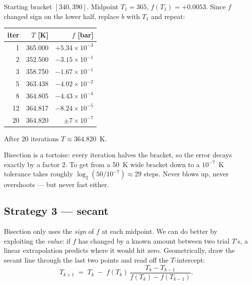 \documentclass[11pt,a4paper]{article}
\begin{document}
\begin{example}
Starting bracket $[340, 390]$.  Midpoint $T_1 = 365$, $f(T_1) = +0.0053$.
Since $f$ changed sign on the lower half, replace $b$ with $T_1$ and
repeat:
\begin{center}\small
\begin{tabular}{rrr}
\toprule
iter & $T$ [K] & $f$ [bar]\\
\midrule
 1 & 365.000 & $+5.34\times 10^{-3}$\\
 2 & 352.500 & $-3.15\times 10^{-1}$\\
 3 & 358.750 & $-1.67\times 10^{-1}$\\
 5 & 363.438 & $-4.02\times 10^{-2}$\\
 8 & 364.805 & $-4.43\times 10^{-4}$\\
12 & 364.817 & $-8.24\times 10^{-5}$\\
20 & 364.820 & $\pm 7\times 10^{-7}$\\
\bottomrule
\end{tabular}
\end{center}
After 20 iterations $T \approx 364.820$~K.
\end{example}

Bisection is a tortoise: every iteration halves the bracket, so the
error decays exactly by a factor 2.  To get from a 50~K wide bracket
down to a $10^{-7}$~K tolerance takes roughly $\log_2(50/10^{-7})
\approx 29$ steps.  Never blows up, never overshoots --- but never
fast either.

\subsection{Strategy 3 --- secant}

Bisection only uses the \emph{sign} of $f$ at each midpoint.  We can
do better by exploiting the \emph{value}: if $f$ has changed by a
known amount between two trial $T$'s, a linear extrapolation
predicts where it would hit zero.  Geometrically, draw the secant
line through the last two points and read off the $T$-intercept:
\begin{equation}
   T_{k+1} \;=\; T_k \;-\; f(T_k)\,\frac{T_k - T_{k-1}}{f(T_k) - f(T_{k-1})}.
   \label{eq:secant}
\end{equation}
\end{document}
